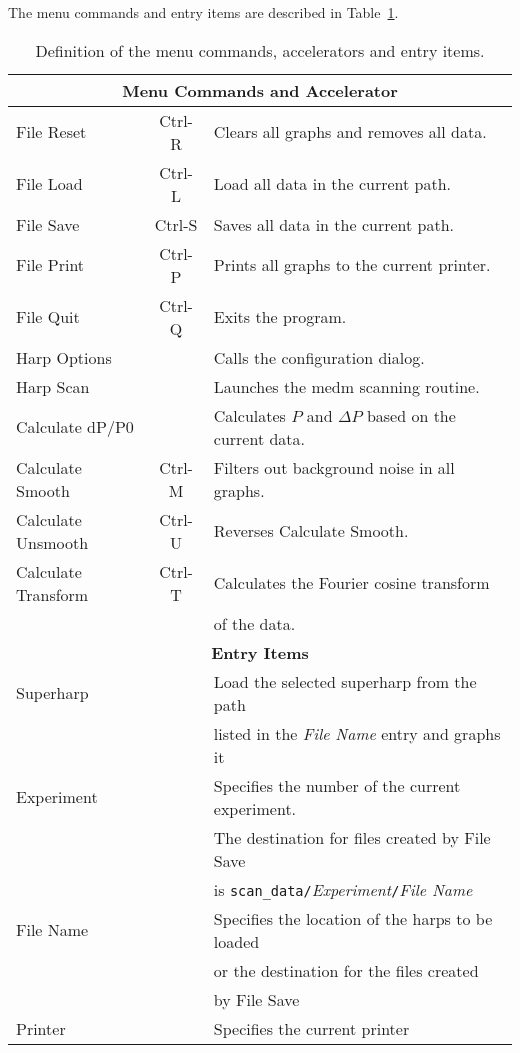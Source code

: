 The menu commands and entry items are described in Table~\ref{table:menu_entry}.
\begin{table}
\begin{center}
\begin{tabular}{||l|c|l||}
\hline
\hline
\multicolumn{3}{|c|}{\bf Menu Commands and Accelerator}	\\
\hline
File Reset & Ctrl-R & Clears all graphs and removes all data. \\
File Load  & Ctrl-L & Load all data in the current path. \\
File Save  & Ctrl-S & Saves all data in the current path. \\
File Print & Ctrl-P & Prints all graphs to the current printer.\\
File Quit & Ctrl-Q & Exits the program. \\
\hline
Harp Options & & Calls the configuration dialog. \\
Harp Scan & & Launches the medm scanning routine. \\
\hline
Calculate dP/P0 & & Calculates $P$ and $\Delta P$ based on the current data. \\
Calculate Smooth & Ctrl-M & Filters out background noise in all graphs. \\
Calculate Unsmooth & Ctrl-U & Reverses Calculate Smooth. \\
Calculate Transform & Ctrl-T & Calculates the Fourier cosine transform \\
		& & of the data. \\
\hline
\hline
\multicolumn{3}{|c|}{\bf Entry Items}	\\
\hline
Superharp	& & Load the selected superharp from the path	\\
		& & listed in the {\it File Name} entry and graphs it		\\
Experiment	& & Specifies the number of the current experiment.	\\
		& & The destination for files created by File Save 	\\
		& & is {\tt scan\_data/}{\it{Experiment}}{\tt /}{\it File Name}	\\
File Name	& & Specifies the location of the harps to be loaded	\\
		& & or the destination for the files created			\\
		& & by File Save			\\
Printer		& & Specifies the current printer				\\
\hline
\hline
\end{tabular}
	\caption{Definition of the menu commands, accelerators and entry items.}\label{table:menu_entry}
\end{center}
\end{table}

